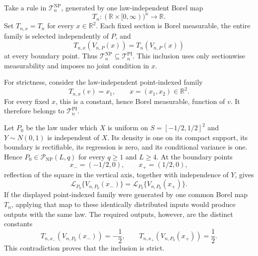 Take a rule in \(\mathcal T_n^{\mathrm{NP}}\), generated by one law-independent Borel map
\[
 T_n:(\mathbb R\times[0,\infty))^n\longrightarrow\mathbb R.
\]
Set \(T_{n,x}=T_n\) for every \(x\in\mathbb R^2\).  Each fixed section is Borel measurable, the entire family is selected independently of \(P\), and
\[
 T_{n,x}(V_{n,P}(x))=T_n(V_{n,P}(x))
\]
at every boundary point.  Thus \(\mathcal T_n^{\mathrm{NP}}\subseteq\mathcal T_n^{\mathrm{PI}}\).  This inclusion uses only sectionwise measurability and imposes no joint condition in \(x\).

For strictness, consider the law-independent point-indexed family
\[
 T_{n,x}(v)=x_1,
 \qquad x=(x_1,x_2)\in\mathbb R^2.
\]
For every fixed \(x\), this is a constant, hence Borel measurable, function of \(v\).  It therefore belongs to \(\mathcal T_n^{\mathrm{PI}}\).

Let \(P_0\) be the law under which \(X\) is uniform on \(S=[-1/2,1/2]^2\) and \(Y\sim N(0,1)\) is independent of \(X\).  Its density is one on its compact support, its boundary is rectifiable, its regression is zero, and its conditional variance is one.  Hence \(P_0\in\mathcal P_{\mathrm{NP}}(L,q)\) for every \(q\geq1\) and \(L\geq4\).  At the boundary points
\[
 x_-=(-1/2,0),
 \qquad
 x_+=(1/2,0),
\]
reflection of the square in the vertical axis, together with independence of \(Y\), gives
\[
 \mathcal L_{P_0}\{V_{n,P_0}(x_-)\}
 =\mathcal L_{P_0}\{V_{n,P_0}(x_+)\}.
\]
If the displayed point-indexed family were generated by one common Borel map \(T_n\), applying that map to these identically distributed inputs would produce outputs with the same law.  The required outputs, however, are the distinct constants
\[
 T_{n,x_-}(V_{n,P_0}(x_-))=-\frac12,
 \qquad
 T_{n,x_+}(V_{n,P_0}(x_+))=\frac12.
\]
This contradiction proves that the inclusion is strict.